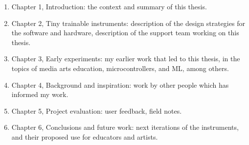 \begin{enumerate}
  \item Chapter 1, Introduction: the context and summary of this thesis.
  \item Chapter 2, Tiny trainable instruments: description of the design strategies for the software and hardware, description of the support team working on this thesis.
  \item Chapter 3, Early experiments: my earlier work that led to this thesis, in the topics of media arts education, microcontrollers, and \acrshort{ML}, among others.
  \item Chapter 4, Background and inspiration: work by other people which has informed my work.
  \item Chapter 5, Project evaluation: user feedback, field notes.
  \item Chapter 6, Conclusions and future work: next iterations of the instruments, and their proposed use for educators and artists.
  \end{enumerate}
